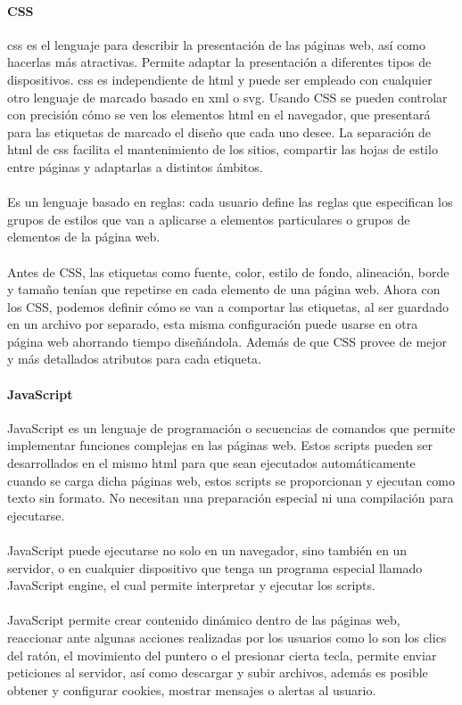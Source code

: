\documentclass[12pt, a4paper, titlepage]{report}
\begin{document}
		   	\paragraph{CSS\\}
		   	
		   	\acrfull{css} es el lenguaje para describir la presentación de las páginas web, así como hacerlas más atractivas. Permite adaptar la presentación a diferentes tipos de dispositivos. \acrshort{css} es independiente de \acrshort{html} y puede ser empleado con cualquier otro lenguaje de marcado basado en \acrshort{xml} o \acrshort{svg}. Usando CSS se pueden controlar con precisión cómo se ven los elementos \acrshort{html} en el navegador, que presentará para las etiquetas de marcado el diseño que cada uno desee. La separación de \acrshort{html} de \acrshort{css} facilita el mantenimiento de los sitios, compartir las hojas de estilo entre páginas y adaptarlas a distintos ámbitos. \cite{refcss}\\\\
		   	Es un lenguaje basado en reglas: cada usuario define las reglas que especifican los grupos de estilos que van a aplicarse a elementos particulares o grupos de elementos de la página web.\\\\
		   	Antes de CSS, las etiquetas como fuente, color, estilo de fondo, alineación, borde y tamaño tenían que repetirse en cada elemento de una página web. Ahora con los CSS, podemos definir cómo se van a comportar las etiquetas, al ser guardado en un archivo por separado, esta misma configuración puede usarse en otra página web ahorrando tiempo diseñándola. Además de que CSS provee de mejor y más detallados atributos para cada etiqueta.
		   	
		   	\paragraph {JavaScript \\}
		   	
		   	JavaScript es un lenguaje de programación o secuencias de comandos que permite implementar funciones complejas en las páginas web. Estos scripts pueden ser desarrollados en el mismo \acrshort{html} para que sean ejecutados automáticamente cuando se carga dicha páginas web, estos scripts se proporcionan y ejecutan como texto sin formato. No necesitan una preparación especial ni una compilación para ejecutarse. \cite{refjs}\\\\
		   	JavaScript puede ejecutarse no solo en un navegador, sino también en un servidor, o en cualquier dispositivo que tenga un programa especial llamado JavaScript engine, el cual permite interpretar y ejecutar los scripts.\\\\
		   	JavaScript permite crear contenido dinámico dentro de las páginas web, reaccionar ante algunas acciones realizadas por los usuarios como lo son los clics del ratón, el movimiento del puntero o el presionar cierta tecla, permite enviar peticiones al servidor, así como descargar y subir archivos, además es posible obtener y configurar cookies, mostrar mensajes o alertas al usuario.
		   	
\end{document}
